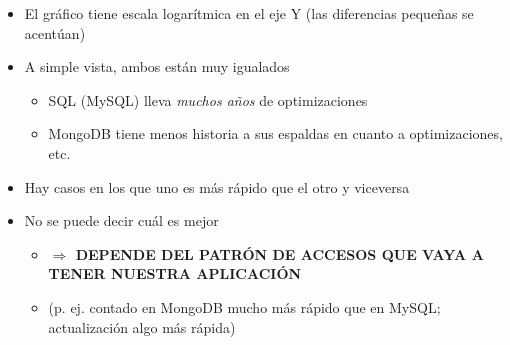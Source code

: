 \documentclass[14pt]{beamer}
\begin{document}
\begin{frame}[allowframebreaks]
\begin{itemize}
\item El gráfico tiene escala logarítmica en el eje Y (las
  diferencias pequeñas se acentúan)
\item A simple vista, ambos están muy igualados
  \begin{itemize}
  \item SQL (MySQL) lleva {\em muchos años} de optimizaciones
  \item MongoDB tiene menos historia a sus espaldas en cuanto a
    optimizaciones, etc.
  \end{itemize}
\item Hay casos en los que uno es más rápido que el otro y viceversa

\framebreak

\item No se puede decir cuál es mejor
  \begin{itemize}
  \item {\bf \color{red} $\Rightarrow$ DEPENDE DEL PATRÓN DE ACCESOS QUE VAYA A
      TENER NUESTRA APLICACIÓN}
  \item (p. ej. contado en MongoDB mucho más rápido que en MySQL;
    actualización algo más rápida)
  \end{itemize}
\end{itemize}

\end{frame}

\end{document}
